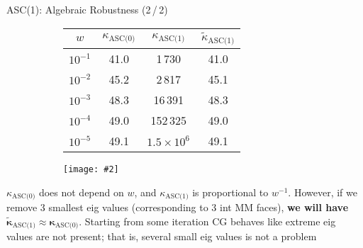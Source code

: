 \documentclass[svgnames]{beamer} %
\newcommand{\includegraphicsw}[2][1.]{\texttt{[image: \#2]}}
\newcommand{\vect}[1]{\boldsymbol{\mathbf{#1}}}
\begin{document}
	\begin{frame}{ASC(1): Algebraic Robustness (2\,/\,2)}
		\begin{figure}
		\centering
		\caption{Condition Numbers of ASC(0)\,/\,ASC(1) Matrices} 
		\begin{subfigure}{.45\linewidth}
			\centering\tiny
			\begin{tabular}[1.2]{ | c | c | c | c |}
				\hline
				$w$ & $\kappa_{\text{ASC(0)}}$ & $\kappa_{\text{ASC(1)}}$ & $\widetilde\kappa_{\text{ASC(1)}}$\\
				\hline
				$10^{-1}$ & 41.0 & 1\,730       & 41.0  \\
				\hline
				$10^{-2}$ & 45.2 & 2\,817       & 45.1  \\
				\hline
				$10^{-3}$ & 48.3 & 16\,391      & 48.3   \\
				\hline
				$10^{-4}$ & 49.0 & 152\,325     & 49.0    \\
				\hline
				$10^{-5}$ & 49.1 & $1.5\times10^6$&49.1  \\
				\hline
			\end{tabular}%
		\end{subfigure}%
		\hfill
		\begin{subfigure}{.55\linewidth}
			\centering
			\includegraphicsw{logplot.png}
		\end{subfigure}
		\end{figure}
		$\kappa_{\text{ASC(0)}}$ does not depend on $w$, and $\kappa_{\text{ASC(1)}}$ is proportional to $w^{-1}$. However, if we remove 3 smallest eig values (corresponding to 3 int MM faces), \textbf{we will have $\tilde{\vect\kappa}_{\text{ASC(1)}} \approx \vect\kappa_{\text{ASC(0)}}$}.
		Starting from some iteration CG behaves like extreme eig values are not present; that is, several small eig values is not a problem 
	\end{frame}
\end{document}
